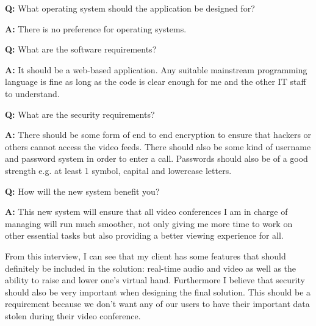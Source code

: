 \begin{tcolorbox}[
  boxrule=0pt, frame empty, colback=lightestgray, arc=0pt,
  breakable, colframe=white
]
  \textbf{Q:} What operating system should the application be 
  designed for? \vspace{0.05cm}

  \textbf{A:} There is no preference for operating systems.
  \vspace{0.25cm}

  \textbf{Q:} What are the software requirements? 
  \vspace{0.05cm}

  \textbf{A:} It should be a web-based application. Any 
  suitable mainstream programming language is fine as long as 
  the code is clear enough for me and the other IT staff to 
  understand.
  \vspace{0.25cm}

  \textbf{Q:} What are the security requirements?
  \vspace{0.05cm}

  \textbf{A:} There should be some form of end to end 
  encryption to ensure that hackers or others cannot access the
  video feeds. There should also be some kind of username and 
  password system in order to enter a call. Passwords should 
  also be of a good strength e.g. at least 1 symbol, capital
  and lowercase letters.
  \vspace{0.25cm}

  \textbf{Q:} How will the new system benefit you? 
  \vspace{0.05cm}

  \textbf{A:} This new system will ensure that all video 
  conferences I am in charge of managing will run much 
  smoother, not only giving me more time to work on other 
  essential tasks but also providing a better viewing
  experience for all.

\end{tcolorbox}

From this interview, I can see that my client has some features
that should definitely be included in the solution: real-time 
audio and video as well as the ability to raise and lower one's
virtual hand. Furthermore I believe that security should also 
be very important when designing the final solution. This 
should be a requirement because we don't want any of our users
to have their important data stolen during their video
conference. \vspace{0.2cm}


